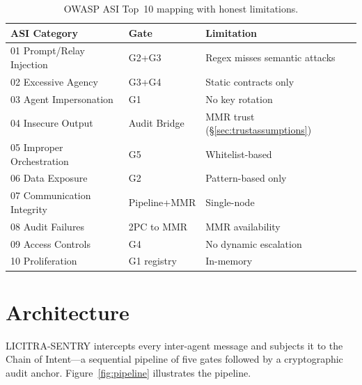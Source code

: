 \documentclass[11pt,a4paper]{article}
\begin{document}
\begin{table}[ht]
\centering
\caption{OWASP ASI Top~10 mapping with honest limitations.}
\label{tab:owasp}
\begin{tabular}{@{}llp{5.5cm}@{}}
\toprule
\textbf{ASI Category} & \textbf{Gate} & \textbf{Limitation} \\
\midrule
01 Prompt/Relay Injection    & G2+G3     & Regex misses semantic attacks \\
02 Excessive Agency          & G3+G4     & Static contracts only \\
03 Agent Impersonation       & G1        & No key rotation \\
04 Insecure Output           & Audit Bridge & MMR trust (\S\ref{sec:trustassumptions}) \\
05 Improper Orchestration    & G5        & Whitelist-based \\
06 Data Exposure             & G2        & Pattern-based only \\
07 Communication Integrity   & Pipeline+MMR & Single-node \\
08 Audit Failures            & 2PC to MMR & MMR availability \\
09 Access Controls           & G4        & No dynamic escalation \\
10 Proliferation             & G1 registry & In-memory \\
\bottomrule
\end{tabular}
\end{table}


\section{Architecture}\label{sec:architecture}

LICITRA-SENTRY intercepts every inter-agent message and subjects it to the Chain of Intent---a
sequential pipeline of five gates followed by a cryptographic audit anchor.
Figure~\ref{fig:pipeline} illustrates the pipeline.
\end{document}
